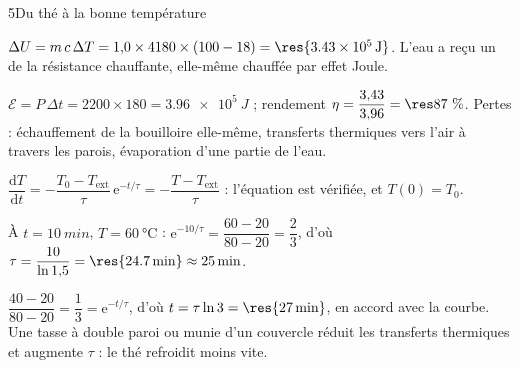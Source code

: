 \begin{corrigeBac}{5}{Du thé à la bonne température}
\begin{questions}
\item $\Delta U=m\,c\,\Delta T=1{,}0\times4180\times(100-18)=\res{\qty{3,43e5}{J}}$. L'eau a reçu un  de la
résistance chauffante, elle-même chauffée par effet Joule. \pts{1 pt}
\item $\mathcal{E}=P\,\Delta t=2200\times180=\qty{3,96e5}{J}$ ; rendement $\eta=\dfrac{3{,}43}{3{,}96}=\res{87~\%}$. Pertes : échauffement de la
bouilloire elle-même, transferts thermiques vers l'air à travers les parois, évaporation d'une partie de l'eau. \pts{1 pt}
\item $\dfrac{\mathrm{d}T}{\mathrm{d}t}=-\dfrac{T_0-T_\mathrm{ext}}{\tau}\,\mathrm{e}^{-t/\tau}=-\dfrac{T-T_\mathrm{ext}}{\tau}$ : l'équation est vérifiée, et $T(0)=T_0$. \pts{1 pt}
\item À $t=\qty{10}{min}$, $T=\qty{60}{\degreeCelsius}$ : $\mathrm{e}^{-10/\tau}=\dfrac{60-20}{80-20}=\dfrac23$, d'où $\tau=\dfrac{10}{\ln1{,}5}=\res{\qty{24,7}{min}}\approx\qty{25}{min}$. 
\item $\dfrac{40-20}{80-20}=\dfrac13=\mathrm{e}^{-t/\tau}$, d'où $t=\tau\ln3=\res{\qty{27}{min}}$, en accord avec la courbe. Une tasse à double paroi ou
munie d'un couvercle réduit les transferts thermiques et augmente $\tau$ : le thé refroidit moins vite. 
\end{questions}
\end{corrigeBac}

